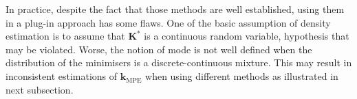\documentclass[preprint, 1p]{elsarticle}
\newcommand{\kmpe}{{\mathbf{k}}_{\mathrm{MPE}}}
\newcommand{\hatkmpe}{\hat{\mathbf{k}}_{\mathrm{MPE}}}
\newcommand{\elise}[1]{{\itshape\color{red} ({#1})}}
\newcommand{\victor}[1]{{\itshape\color{green} ({#1})}}
\begin{document}



In practice, despite the fact that those methods are well established, using them in a plug-in approach has some flaws. One of the basic assumption of density estimation is to assume that $\mathbf{K}^*$ is a continuous random variable, hypothesis that may be violated. Worse, the notion of mode is not well defined when the distribution of the minimisers is a discrete-continuous mixture. This may result in inconsistent 
estimations of $\hatkmpe$ when using different methods as illustrated in next subsection.



\end{document}

